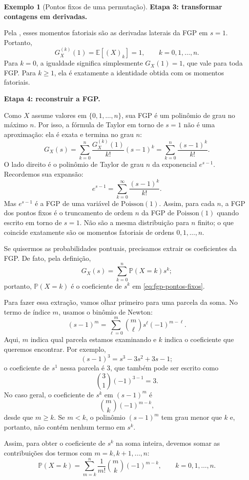 \documentclass[12pt,portuguese]{article}
\theoremstyle{definition}
\newtheorem{example}[example]{Exemplo}
\theoremstyle{plainexercise}
\theoremstyle{starredexercise}
\theoremstyle{definition}
\begin{document}
\begin{example}[Pontos fixos de uma permutação]
\medskip
\noindent\textbf{Etapa 3: transformar contagens em derivadas.}

Pela , esses momentos fatoriais são
as derivadas laterais da FGP em $s=1$. Portanto,
\[
G_X^{(k)}(1)=\mathbb{E}[(X)_k]=1,
\qquad k=0,1,\ldots,n.
\]
Para $k=0$, a igualdade significa simplesmente $G_X(1)=1$, que vale para toda
FGP. Para $k\geqslant1$, ela é exatamente a identidade obtida com os
momentos fatoriais.

\medskip
\noindent\textbf{Etapa 4: reconstruir a FGP.}

Como $X$ assume valores em $\{0,1,\ldots,n\}$, sua FGP é um polinômio de
grau no máximo $n$. Por isso, a fórmula de Taylor em torno de $s=1$ não é uma
aproximação: ela é exata e termina no grau $n$:
\begin{equation}\label{eq:fgp-pontos-fixos}
G_X(s)
=\sum_{k=0}^{n}\frac{G_X^{(k)}(1)}{k!}(s-1)^k
=\sum_{k=0}^{n}\frac{(s-1)^k}{k!}.
\end{equation}
O lado direito é o polinômio de Taylor de grau $n$ da exponencial
$e^{s-1}$. Recordemos sua expansão:
\[
e^{s-1}=\sum_{k=0}^{\infty}\frac{(s-1)^k}{k!}.
\]
Mas $e^{s-1}$ é a FGP de uma variável de $\mathrm{Poisson}(1)$. Assim, para
cada $n$, a FGP dos pontos fixos é o truncamento de ordem $n$ da FGP de
$\mathrm{Poisson}(1)$ quando escrito em torno de $s=1$. Não são a mesma
distribuição para $n$ finito; o que coincide exatamente são os momentos
fatoriais de ordens $0,1,\ldots,n$.

Se quisermos as probabilidades pontuais, precisamos extrair os coeficientes
da FGP. De fato, pela definição,
\[
G_X(s)=\sum_{k=0}^{n}\mathbb{P}(X=k)s^k;
\]
portanto, $\mathbb{P}(X=k)$ é o coeficiente de $s^k$ em
\eqref{eq:fgp-pontos-fixos}.

Para fazer essa extração, vamos olhar primeiro para uma parcela da soma. No
termo de índice $m$, usamos o binômio de Newton:
\[
(s-1)^m
=\sum_{\ell=0}^{m}\binom{m}{\ell}s^\ell(-1)^{m-\ell}.
\]
Aqui, $m$ indica qual parcela estamos examinando e $k$ indica o coeficiente
que queremos encontrar. Por exemplo,
\[
(s-1)^3=s^3-3s^2+3s-1;
\]
o coeficiente de $s^1$ nessa parcela é $3$, que também pode ser escrito como
\[
\binom{3}{1}(-1)^{3-1}=3.
\]
No caso geral, o coeficiente de $s^k$ em $(s-1)^m$ é
\[
\binom{m}{k}(-1)^{m-k},
\]
desde que $m\geqslant k$. Se $m<k$, o polinômio $(s-1)^m$ tem grau menor
que $k$ e, portanto, não contém nenhum termo em $s^k$.

Assim, para obter o coeficiente de $s^k$ na soma inteira, devemos somar as
contribuições dos termos com $m=k,k+1,\ldots,n$:
\begin{equation}\label{eq:dist-pontos-fixos}
\mathbb{P}(X=k)
=\sum_{m=k}^{n}\frac{1}{m!}
  \binom{m}{k}(-1)^{m-k},
\qquad k=0,1,\ldots,n.
\end{equation}


\end{example}
\end{document}
